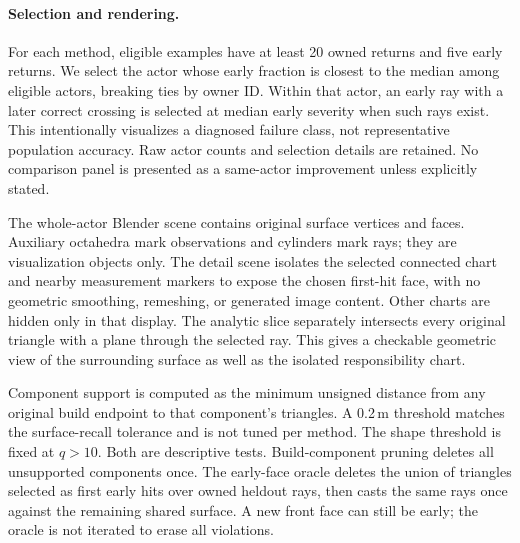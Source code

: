 \begin{table}[h]
\centering\small
\caption{Exact oracle ladder and unsupported-component early contribution, all in percentage points of owned returns. ``Unsupported early'' is a subset of early under the stated build-component test. It is not a classifier of physical floaters.}
\end{table}

\paragraph{Selection and rendering.}
For each method, eligible examples have at least 20 owned returns and five early returns. We select the actor whose early fraction is closest to the median among eligible actors, breaking ties by owner ID. Within that actor, an early ray with a later correct crossing is selected at median early severity when such rays exist. This intentionally visualizes a diagnosed failure class, not representative population accuracy. Raw actor counts and selection details are retained. No comparison panel is presented as a same-actor improvement unless explicitly stated.

The whole-actor Blender scene contains original surface vertices and faces. Auxiliary octahedra mark observations and cylinders mark rays; they are visualization objects only. The detail scene isolates the selected connected chart and nearby measurement markers to expose the chosen first-hit face, with no geometric smoothing, remeshing, or generated image content. Other charts are hidden only in that display. The analytic slice separately intersects every original triangle with a plane through the selected ray. This gives a checkable geometric view of the surrounding surface as well as the isolated responsibility chart.

Component support is computed as the minimum unsigned distance from any original build endpoint to that component's triangles. A 0.2\,m threshold matches the surface-recall tolerance and is not tuned per method. The shape threshold is fixed at $q>10$. Both are descriptive tests. Build-component pruning deletes all unsupported components once. The early-face oracle deletes the union of triangles selected as first early hits over owned heldout rays, then casts the same rays once against the remaining shared surface. A new front face can still be early; the oracle is not iterated to erase all violations.

